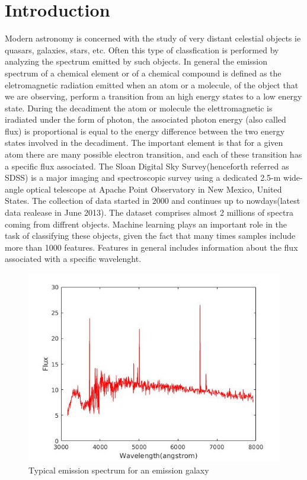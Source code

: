 \documentclass[a4paper,10pt]{article}
\begin{document}
\section{Introduction}
  Modern astronomy is concerned with the study of very distant celestial objects ie quasars, galaxies, stars, etc.\newline
  Often this type of classfication is performed by analyzing the spectrum emitted by such objects.\newline
  In general the emission spectrum of a chemical element or of a chemical compound is defined as the eletromagnetic radiation emitted
  when an atom or a molecule, of the object that we are observing, perform a transition from an high energy states to a low energy state.
  During the decadiment the atom or molecule the elettromagnetic is iradiated under the form of photon, the associated photon energy
  (also called flux) is proportional is equal to the energy difference between the two energy states involved in the decadiment.\newline
  The important element is that for a given atom there are many possible electron transition, and each of these transition has a specific
  flux associated.\newline
  The Sloan Digital Sky Survey(henceforth referred as SDSS) is a major imaging and spectroscopic survey using a dedicated 2.5-m wide-angle
  optical telescope at Apache Point Observatory in New Mexico, United States.\newline
  The collection of data started in 2000 and continues up to nowdays(latest data realease in June 2013). The dataset comprises almost
  2 millions of spectra coming from diffrent objects.\newline
  Machine learning plays an important role in the task of classifying these objects, given the fact that many times samples include
  more than 1000 features.\newline
  Features in general includes information about the flux associated with a specific wavelenght.
  \begin{figure}[!ht]
    \caption{Typical emission spectrum for an emission galaxy}
    \centering
    \includegraphics[scale=0.5]{emission_galaxy.jpg}
  \end{figure}
  
\end{document}
